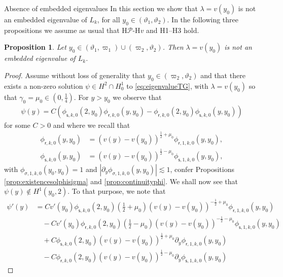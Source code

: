 \documentclass[11pt,reqno]{amsproc}
\makeatletter
\renewcommand\subsection{\@startsection{subsection}{2}%
\normalparindent{.5\linespacing\@plus.7\linespacing}{-.5em}
{\normalfont\bfseries}}
\newtheorem{proposition}{Proposition}[section]
\theoremstyle{definition}
\numberwithin{equation}{section}
\newcommand{\sr}{{\mathsf{r}}}
\newcommand{\s}{{\mathsf{s}}}
\renewcommand{\P}{{\mathcal{P}}}
\makeatother
\begin{document}
\subsection{Absence of embedded eigenvalues}
In this section we show that $\lambda= v(y_0)$ is not an embedded eigenvalue of $L_k$, for all $y_0\in (\vartheta_1,\vartheta_2)$. In the following three propositions we assume as usual that {H$\P$-H$v$} and H1--H3 hold. 

\begin{proposition}\label{prop:noembedweak}
Let $y_0\in (\vartheta_1, \varpi_1) \cup (\varpi_2,\vartheta_2)$. Then $\lambda= v(y_0)$ is not an embedded eigenvalue of $L_k$.
\end{proposition}

\begin{proof}
    Assume without loss of generality that $y_0\in (\varpi_2,\vartheta_2)$ and that there exists a non-zero solution $\psi\in H^2\cap H^1_0$ to \eqref{eq:eigenvalueTG}, with $\lambda = v(y_0)$ so that $\gamma_0 = \mu_0\in (0,\frac14)$. For $y>y_0$ we observe that
    \begin{align*}
        \psi(y) = C \left( \phi_{\s,k,0}(2,y_0)\phi_{\sr,k,0}(y,y_0) - \phi_{\sr,k,0}(2,y_0)\phi_{\s,k,0}(y,y_0) \right)
    \end{align*}
for some $C>0$ and where we recall that
\begin{align*}
    \phi_{\sr,k,0}(y,y_0) &= (v(y) - v(y_0))^{\frac12+\mu_0}\phi_{\sr,1,k,0}(y,y_0), \\
    \phi_{\s,k,0}(y,y_0) &= (v(y) - v(y_0))^{\frac12-\mu_0}\phi_{\s,1,k,0}(y,y_0), 
\end{align*}
with $\phi_{\sigma,1,k,0}(y_0,y_0)=1$ and $\left| \partial_y \phi_{\sigma,1,k,0}(y,y_0) \right| \lesssim 1$, confer Propositions \ref{prop:existencesolphisigma} and \ref{prop:continuityphi}. We shall now see that $\psi(y)\not \in H^1(y_0,2)$. To that purpose, we note that 
\begin{align*}
    \psi'(y) &= Cv'(y_0)  \phi_{\s,k,0}(2,y_0) \left(\frac12+\mu_0 \right)(v(y) - v(y_0))^{-\frac12+\mu_0}\phi_{\sr,1,k,0}(y,y_0) \\
    &\quad - Cv'(y_0)\phi_{\sr,k,0}(2,y_0)\left(\frac12-\mu_0 \right)(v(y) - v(y_0))^{-\frac12-\mu_0} \phi_{\s,1,k,0}(y,y_0) \\
    &\quad + C  \phi_{\s,k,0}(2,y_0) (v(y) - v(y_0))^{\frac12+\mu_0}\partial_y\phi_{\sr,1,k,0}(y,y_0) \\
    &\quad - C\phi_{\sr,k,0}(2,y_0)(v(y) - v(y_0))^{\frac12-\mu_0} \partial_y\phi_{\s,1,k,0}(y,y_0)

\end{align*}
\end{proof}
\end{document}
